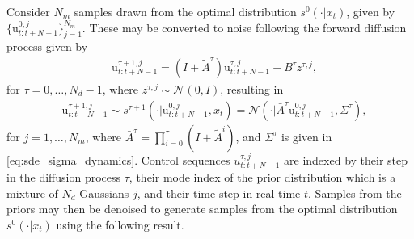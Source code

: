 \documentclass[letterpaper, 10 pt, conference]{IEEEconf}
\begin{document}
Consider $N_m$ samples drawn from the optimal distribution $s^{0}(\cdot | x_{t})$, given by $\{\mathrm{u}_{t:t+N-1}^{0, j} \}_{j=1}^{N_m}$. 
These may be converted to noise following the forward diffusion process given by
\begin{align} \label{eq:proposed_markov_diffusion}
    &\mathrm{u}_{t:t+N-1}^{\tau+1, j} = (I + \tilde{A}^{\tau}) \mathrm{u}_{t:t+N-1}^{\tau, j} + B^{\tau} z^{\tau, j},
\end{align}
for $\tau = 0, \dots, N_d-1$,
where $z^{\tau, j} \sim \mathcal{N}(0, I)$,
resulting in %
\begin{align} \label{eq:proposed_forward_diffusion}
    &\mathrm{u}_{t:t+N-1}^{\tau+1, j} \sim 
    s^{\tau+1}(\cdot | \mathrm{u}_{t:t+N-1}^{0, j}, x_{t}) = \mathcal{N}(\cdot | \bar{A}^{\tau} \mathrm{u}_{t:t+N-1}^{0, j}, \Sigma^{\tau}),
\end{align}
for $j = 1, \dots, N_m$,
where $\bar{A}^{\tau} = \prod_{i=0}^{\tau} (I + \tilde{A}^{i})$, and $\Sigma^{\tau}$ is given in \eqref{eq:sde_sigma_dynamics}.
Control sequences $u_{t:t+N-1}^{\tau, j}$ are indexed by their step in the diffusion process $\tau$, their mode index of the prior distribution which is a mixture of $N_d$ Gaussians $j$, and their time-step in real time $t$.
Samples from the priors may then be denoised to generate samples from the optimal distribution $s^{0}(\cdot | x_{t})$ using the following result.
\end{document}
